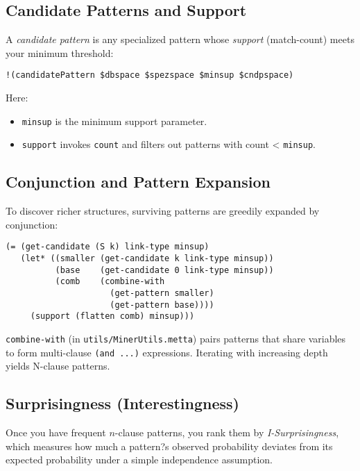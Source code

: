 \documentclass{article}
\begin{document}
\subsection{Candidate Patterns and Support}

A \emph{candidate pattern} is any specialized pattern whose \emph{support} (match-count) meets your minimum threshold:

\begin{verbatim}
!(candidatePattern $dbspace $spezspace $minsup $cndpspace)
\end{verbatim}

Here:
\begin{itemize}
  \item \texttt{minsup} is the minimum support parameter.
  \item \texttt{support} invokes \texttt{count} and filters out patterns with count < \texttt{minsup}.
\end{itemize}

\subsection{Conjunction and Pattern Expansion}

To discover richer structures, surviving patterns are greedily expanded by conjunction:

\begin{verbatim}
(= (get-candidate (S k) link-type minsup)
   (let* ((smaller (get-candidate k link-type minsup))
          (base    (get-candidate 0 link-type minsup))
          (comb    (combine-with
                     (get-pattern smaller)
                     (get-pattern base))))
     (support (flatten comb) minsup)))
\end{verbatim}

\texttt{combine-with} (in \texttt{utils/MinerUtils.metta}) pairs patterns that share variables to form multi-clause \verb|(and ...)| expressions.  Iterating with increasing depth yields N-clause patterns.

\subsection{Surprisingness (Interestingness)}

Once you have frequent $n$-clause patterns, you rank them by \emph{I-Surprisingness}, which measures how much a pattern?s observed probability deviates from its expected probability under a simple independence assumption.  
\end{document}
